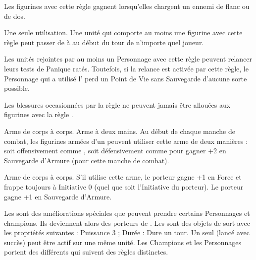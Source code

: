 \armyspecialruleentry{\packtactics}

Les figurines avec cette règle gagnent \swiftstride{} lorsqu'elles chargent un ennemi de flanc ou de dos.

\armyspecialruleentry{\lootedbooze}

Une seule utilisation. Une unité qui comporte au moins une figurine avec cette règle peut passer de \sober{} à \drunk{} au début du tour de n'importe quel joueur.

\armyspecialruleentry{\bloodoffering}

Les unités rejointes par au moins un Personnage avec cette règle peuvent relancer leurs tests de Panique ratés. Toutefois, si la relance est activée par cette règle, le Personnage qui a utilisé l'\bloodoffering{} perd un Point de Vie sans Sauvegarde d'aucune sorte possible.

\armyspecialruleentry{\halfhorse}

Les blessures occasionnées par la règle \stomp{} ne peuvent jamais être allouées aux figurines avec la règle \halfhorse{}.

\closearmyspecialrules

\vspace*{1.5cm}
\startarmyarmoury

\startitemlistonecol

\listitemonecol{\soothsayerstaff} Arme de corps à corps. Arme à deux mains. Au début de chaque manche de combat, les figurines armées d'un \soothsayerstaff{} peuvent utiliser cette arme de deux manières : soit offensivement comme \gw{}, soit défensivement comme \hw{} pour gagner +2 en Sauvegarde d'Armure (pour cette manche de combat).

\listitemonecol{\beastaxe} Arme de corps à corps. S'il utilise cette arme, le porteur gagne +1 en Force et frappe toujours à Initiative 0 (quel que soit l'Initiative du porteur). Le porteur gagne +1 en Sauvegarde d'Armure.

\enditemlistonecol

\closearmyarmoury

\startarmynewsection{\totems}

\spaceaftersection{}

Les \totems{} sont des améliorations spéciales que peuvent prendre certains Personnages et champions. Ils deviennent alors des porteurs de \totem{}. Les \totems{} sont des objets de sort avec les propriétés suivantes : Puissance 3 ; Durée : Dure un tour. Un seul \totem{} (lancé avec succès) peut être actif sur une même unité. Les Champions et les Personnages portent des \totems{} différents qui suivent des règles distinctes.

